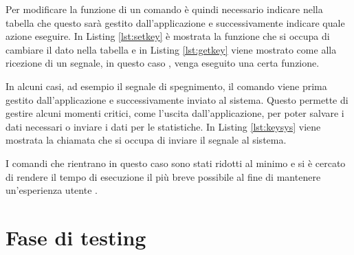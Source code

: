 Per modificare la funzione di un comando è quindi necessario indicare nella tabella che questo sarà gestito dall'applicazione e successivamente indicare quale azione eseguire. In Listing \ref*{lst:setkey} è mostrata la funzione che si occupa di cambiare il dato nella tabella e in Listing \ref*{lst:getkey} viene mostrato come alla ricezione di un segnale, in questo caso , venga eseguito una certa funzione.




In alcuni casi, ad esempio il segnale di spegnimento, il comando viene prima gestito dall'applicazione e successivamente inviato al sistema. Questo permette di gestire alcuni momenti critici, come l'uscita dall'applicazione, per poter salvare i dati necessari o inviare i dati per le statistiche.
In Listing \ref*{lst:keysys} viene mostrata la chiamata che si occupa di inviare il segnale al sistema.



I comandi che rientrano in questo caso sono stati ridotti al minimo e si è cercato di rendere il tempo di esecuzione il più breve possibile al fine di mantenere un'esperienza utente .

\section{Fase di testing}

